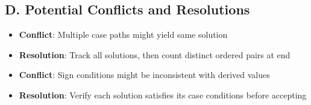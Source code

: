 \documentclass[]{article}
\begin{document}
\begin{techniquesbox}
\subsection*{D. Potential Conflicts and Resolutions}
\begin{itemize}[leftmargin=*]
    \item \textbf{Conflict}: Multiple case paths might yield same solution
    \item \textbf{Resolution}: Track all solutions, then count distinct ordered pairs at end
    \item \textbf{Conflict}: Sign conditions might be inconsistent with derived values
    \item \textbf{Resolution}: Verify each solution satisfies its case conditions before accepting
\end{itemize}
\end{techniquesbox}
\end{document}
